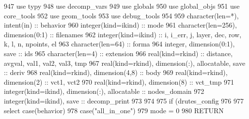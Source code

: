 \begin{DoxyCode}
947       \textcolor{keywordtype}{use }typy 
948       \textcolor{keywordtype}{use }decomp_vars
949       \textcolor{keywordtype}{use }globals
950       \textcolor{keywordtype}{use }global_objs
951       \textcolor{keywordtype}{use }core_tools
952       \textcolor{keywordtype}{use }geom_tools
953       \textcolor{keywordtype}{use }debug_tools
954 
959       \textcolor{keywordtype}{character(len=*)}, \textcolor{keywordtype}{intent(in)}                          :: behavior
960       \textcolor{keywordtype}{integer(kind=ikind)}                                   :: mode
961       \textcolor{keywordtype}{character(len=256)}, \textcolor{keywordtype}{dimension(0:1)}                    :: filenames
962       \textcolor{keywordtype}{integer(kind=ikind)}                                   :: i, i\_err,\textcolor{comment}{ j, layer, dec, row, k, l, n, 
      npoints, el}
963 \textcolor{comment}{      }\textcolor{keywordtype}{character(len=64)}                                     :: forma
964       \textcolor{keywordtype}{integer}, \textcolor{keywordtype}{dimension(0:1)}, \textcolor{keywordtype}{save}                         :: ids
965       \textcolor{keywordtype}{character(len=4)}                                      :: extension
966       \textcolor{keywordtype}{real(kind=rkind)}                                      :: distance,\textcolor{comment}{ avgval, val1, val2, val3, tmp}
967 \textcolor{comment}{      }\textcolor{keywordtype}{real(kind=rkind)}, \textcolor{keywordtype}{dimension(:)}, \textcolor{keywordtype}{allocatable}, \textcolor{keywordtype}{save}     :: deriv
968       \textcolor{keywordtype}{real(kind=rkind)}, \textcolor{keywordtype}{dimension(4,8)}                      :: body
969       \textcolor{keywordtype}{real(kind=rkind)}, \textcolor{keywordtype}{dimension(2)}                        :: vct1, vct2
970       \textcolor{keywordtype}{real(kind=rkind)}, \textcolor{keywordtype}{dimension(8)}                        :: vct\_tmp
971       \textcolor{keywordtype}{integer(kind=ikind)}, \textcolor{keywordtype}{dimension(:)}, \textcolor{keywordtype}{allocatable}        :: nodes\_domain
972       \textcolor{keywordtype}{integer(kind=ikind)}, \textcolor{keywordtype}{save}                             :: decomp\_print
973 
974 
975       \textcolor{keywordflow}{if} (drutes_config%
976       
977       \textcolor{keywordflow}{select case}(behavior)
978         \textcolor{keywordflow}{case}(\textcolor{stringliteral}{"all\_in\_one"})
979               mode = 0
980               \textcolor{keywordflow}{RETURN}

\end{DoxyCode}
